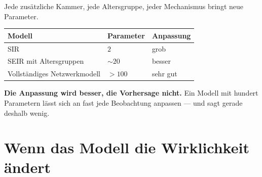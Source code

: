 \begin{warnung}
Jede zusätzliche Kammer, jede Altersgruppe, jeder Mechanismus bringt neue Parameter.

\begin{center}
\renewcommand{\arraystretch}{1.5}
\begin{tabular}{@{}P{2.6cm}P{2.4cm}P{2.6cm}@{}}
\toprule
\textbf{Modell} & \textbf{Parameter} & \textbf{Anpassung}\\
\midrule
SIR & $2$ & \textcolor{mittel}{grob}\\
SEIR mit Altersgruppen & $\sim 20$ & besser\\
Vollständiges Netzwerkmodell & $> 100$ & \textcolor{gruen}{sehr gut}\\
\bottomrule
\end{tabular}
\end{center}

\begin{center}
\begin{minipage}{0.9\textwidth}
\textbf{Die Anpassung wird besser, die Vorhersage nicht.} Ein Modell mit hundert Parametern lässt sich an fast jede Beobachtung anpassen --- und sagt gerade deshalb wenig.
\end{minipage}
\end{center}

\begin{center}
\begin{minipage}{0.88\textwidth}
\end{minipage}
\end{center}
\end{warnung}

\section{Wenn das Modell die Wirklichkeit ändert}

